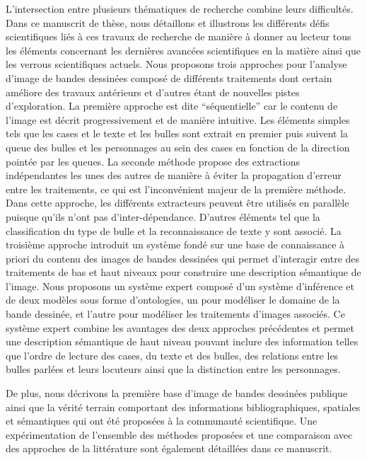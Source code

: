 L'intersection entre plusieurs thématiques de recherche combine leurs difficultés.
Dans ce manuscrit de thèse, nous détaillons et illustrons les différents défis scientifiques liés à ces travaux de recherche de manière à donner au lecteur tous les éléments concernant les dernières avancées scientifiques en la matière ainsi que les verrous scientifiques actuels. 
Nous proposons trois approches pour l'analyse d'image de bandes dessinées composé de différents traitements dont certain améliore des travaux antérieurs et d'autres étant de nouvelles pistes d'exploration.
La première approche est dite ``séquentielle'' car le contenu de l'image est décrit progressivement et de manière intuitive.
Les éléments simples tels que les cases et le texte et les bulles sont extrait en premier puis suivent la queue des bulles et les personnages au sein des cases en fonction de la direction pointée par les queues.
La seconde méthode propose des extractions indépendantes les unes des autres de manière à éviter la propagation d'erreur entre les traitements, ce qui est l'inconvénient majeur de la première méthode.
Dans cette approche, les différents extracteurs peuvent être utilisés en parallèle puisque qu'ils n'ont pas d'inter-dépendance.
D'autres éléments tel que la classification du type de bulle et la reconnaissance de texte y sont associé.
La troisième approche introduit un système fondé sur une base de connaissance à priori du contenu des images de bandes dessinées qui permet d'interagir entre des traitements de bas et haut niveaux pour construire une description sémantique de l'image.
Nous proposons un système expert composé d'un système d'inférence et de deux modèles sous forme d'ontologies, un pour modéliser le domaine de la bande dessinée, et l'autre pour modéliser les traitements d'images associés.
Ce système expert combine les avantages des deux approches précédentes et permet une description sémantique de haut niveau pouvant inclure des information telles que l'ordre de lecture des cases, du texte et des bulles, des relations entre les bulles parlées et leurs locuteurs ainsi que la distinction entre les personnages.

De plus, nous décrivons la première base d'image de bandes dessinées publique ainsi que la vérité terrain comportant des informations bibliographiques, spatiales et sémantiques qui ont été proposées à la communauté scientifique.
Une expérimentation de l'ensemble des méthodes proposées et une comparaison avec des approches de la littérature sont également détaillées dans ce manuscrit.



\clearpage\thispagestyle{empty}